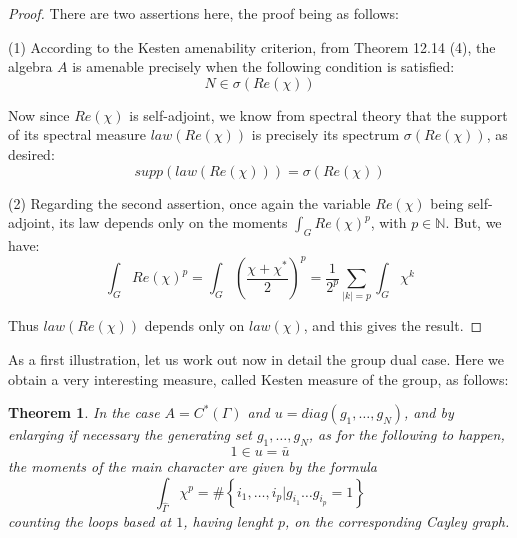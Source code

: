 \documentclass[12pt]{amsbook}
\newtheorem{theorem}{Theorem}[chapter]
\begin{document}
\begin{proof}
There are two assertions here, the proof being as follows:

\medskip

(1) According to the Kesten amenability criterion, from Theorem 12.14 (4), the algebra $A$ is amenable precisely when the following condition is satisfied:
$$N\in\sigma(Re(\chi))$$

Now since $Re(\chi)$ is self-adjoint, we know from spectral theory that the support of its spectral measure $law(Re(\chi))$ is precisely its spectrum $\sigma(Re(\chi))$, as desired:
$$supp(law(Re(\chi)))=\sigma(Re(\chi))$$

(2) Regarding the second assertion, once again the variable $Re(\chi)$ being self-adjoint, its law depends only on the moments $\int_GRe(\chi)^p$, with $p\in\mathbb N$. But, we have:
$$\int_GRe(\chi)^p
=\int_G\left(\frac{\chi+\chi^*}{2}\right)^p
=\frac{1}{2^p}\sum_{|k|=p}\int_G\chi^k$$

Thus $law(Re(\chi))$ depends only on $law(\chi)$, and this gives the result.
\end{proof}

As a first illustration, let us work out now in detail the group dual case. Here we obtain a very interesting measure, called Kesten measure of the group, as follows:

\begin{theorem}
In the case $A=C^*(\Gamma)$ and $u=diag(g_1,\ldots,g_N)$, and by enlarging if necessary the generating set $g_1,\ldots,g_N$, as for the following to happen,
$$1\in u=\bar{u}$$
the moments of the main character are given by the formula
$$\int_{\widehat{\Gamma}}\chi^p=\#\left\{i_1,\ldots,i_p\Big|g_{i_1}\ldots g_{i_p}=1\right\}$$
counting the loops based at $1$, having lenght $p$, on the corresponding Cayley graph.
\end{theorem}
\end{document}
